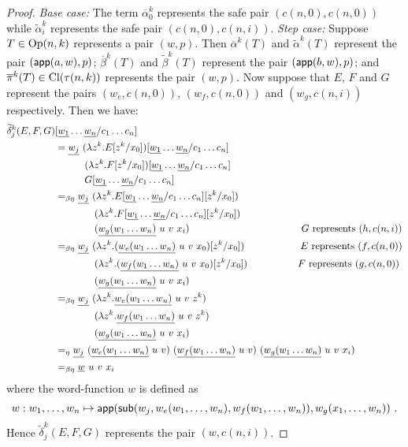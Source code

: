 \begin{proof}
\emph{Base case:} The term $\overline\alpha_0^k$ represents the safe pair $(c(n,0),c(n,0))$ while
$\widetilde\alpha_i^k$ represents the safe pair
$(c(n,0),c(n,i))$. \emph{Step case:} Suppose $T\in
{\rm Op}(n,k)$ represents
 a pair $(w,p)$.  Then $\overline\alpha^k(T)$ and
 $\widetilde\alpha^k(T)$ represent the pair
 $({\sf app}(a,w),p)$; $\overline\beta^k(T)$ and
 $\widetilde\beta^k(T)$ represent the pair
 $({\sf app}(b,w),p)$; and $\overline\pi^k(T) \in {\rm Cl}(\tau(n,k))$ represents the pair $(w,p)$. Now suppose that $E$, $F$ and $G$ represent the pairs
 $(w_e,c(n,0))$, $(w_f,c(n,0))$ and $(w_g,c(n,i))$ respectively.
 Then we have:
 \begin{alignat*}{2}
   \widetilde \delta^k_j (E,F,G) &[\zaioncencode{w_1}\ldots \zaioncencode{w_n}/c_1\ldots c_n] \\
   &= \zaioncencode{w_j}\  (\lambda z^k. E[z^k/x_0])[\zaioncencode{w_1}\ldots \zaioncencode{w_n}/c_1\ldots c_n] \\
       & \qquad\quad (\lambda z^k. F[z^k/x_0])[\zaioncencode{w_1}\ldots \zaioncencode{w_n}/c_1\ldots c_n] \\
       & \qquad\quad  G[\zaioncencode{w_1}\ldots \zaioncencode{w_n}/c_1\ldots c_n] \\
   &=_{\beta\eta} \zaioncencode{w_j}\  (\lambda z^k. E[\zaioncencode{w_1}\ldots \zaioncencode{w_n}/c_1\ldots c_n][z^k/x_0]) \\
       & \qquad\qquad (\lambda z^k. F[\zaioncencode{w_1}\ldots \zaioncencode{w_n}/c_1\ldots c_n][z^k/x_0]) \\
       & \qquad\qquad  (\zaioncencode{w_g(w_1\ldots w_n)}~u~v~x_i) \hspace{4cm}\mbox{$G$ represents $(h,c(n,i))$}\\
   &=_{\beta\eta} \zaioncencode{w_j}\  (\lambda z^k. (\zaioncencode{w_e(w_1\ldots w_n)}~u~v~x_0)[z^k/x_0]) \hspace{2cm}\mbox{$E$ represents $(f,c(n,0))$} \\
       & \qquad\qquad (\lambda z^k. (\zaioncencode{w_f(w_1\ldots w_n)}~u~v~x_0)[z^k/x_0]) \hspace{1.8cm}\mbox{$F$ represents $(g,c(n,0))$} \\
       & \qquad\qquad  (\zaioncencode{w_g(w_1\ldots w_n)}~u~v~x_i)\\
%
   &=_{\beta\eta} \zaioncencode{w_j}\  (\lambda z^k. \zaioncencode{w_e(w_1\ldots w_n)}~u~v~z^k) \\
       & \qquad\qquad (\lambda z^k. \zaioncencode{w_f(w_1\ldots w_n)}~u~v~z^k) \\
       & \qquad\qquad (\zaioncencode{w_g(w_1\ldots w_n)}~u~v~x_i)\\
%
   &=_\eta \zaioncencode{w_j}\  (\zaioncencode{w_e(w_1\ldots w_n)}~u~v)  \ (\zaioncencode{w_f(w_1\ldots w_n)}~u~v) \  (\zaioncencode{w_g(w_1\ldots w_n)}~u~v~x_i)\\
%
   &=_{\beta\eta}  \zaioncencode{w}~u~v~ x_i
 \end{alignat*}
where the word-function $w$ is defined as
$$w: w_1,\ldots,w_n \mapsto {\sf app}({\sf sub}(w_j,w_e(w_1,\ldots,w_n),w_f(w_1,\ldots,w_n)),w_g(x_1,\ldots,w_n)) \ .$$
  Hence $\widetilde \delta^k_j (E,F,G)$ represents the pair $(w,c(n,i))$.


\end{proof}
